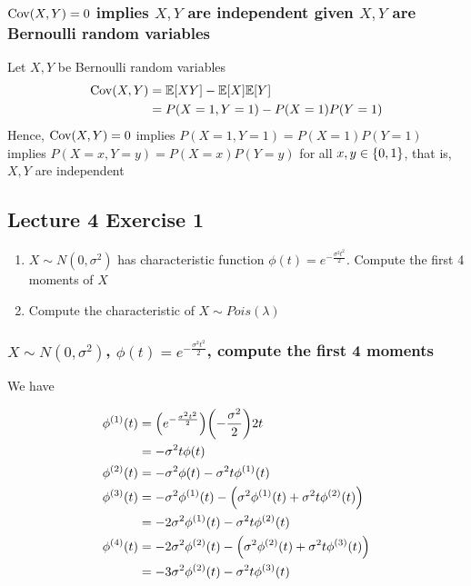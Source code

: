 \documentclass{article}
\begin{document}
\subsubsection{$\operatorname{Cov}(X, Y) = 0$ implies $X, Y$ are independent given $X, Y$ are Bernoulli random variables}

Let $X, Y$ be Bernoulli random variables
\begin{align*}
    \operatorname{Cov}(X, Y)
    &= \mathbb{E}[XY] - \mathbb{E}[X]\mathbb{E}[Y] \\
    &= P(X=1, Y=1) - P(X=1) P(Y=1)
\end{align*}
Hence, $\operatorname{Cov}(X, Y) = 0$ implies $P(X=1, Y=1) = P(X=1) P(Y=1)$ implies $P(X=x, Y=y) = P(X=x) P(Y=y)$ for all $x, y \in \{0, 1\}$, that is, $X, Y$ are independent
        

\subsection{Lecture 4 Exercise 1}

\begin{enumerate}
    \item $X \sim N(0, \sigma^2)$ has characteristic function $\phi(t) = e^{- \frac{\sigma^2 t^2}{2}}$. Compute the first 4 moments of $X$

    \item Compute the characteristic of $X \sim Pois(\lambda)$
\end{enumerate}

\subsubsection{$X \sim N(0, \sigma^2)$, $\phi(t) = e^{- \frac{\sigma^2 t^2}{2}}$, compute the first 4 moments}

We have

\begin{align*}
    \phi^{(1)}(t)
    &= \tuple*{e^{- \frac{\sigma^2 t^2}{2}}} \tuple*{-\frac{\sigma^2}{2}} 2t \\
    &= -\sigma^2 t \phi(t) \\
    \phi^{(2)}(t) 
    &= -\sigma^2 \phi(t) - \sigma^2 t \phi^{(1)}(t) \\
    \phi^{(3)}(t)
    &= -\sigma^2 \phi^{(1)}(t) - \tuple*{\sigma^2 \phi^{(1)}(t) + \sigma^2 t \phi^{(2)}(t)} \\
    &= - 2 \sigma^2 \phi^{(1)}(t) - \sigma^2 t \phi^{(2)}(t) \\
    \phi^{(4)}(t)
    &= - 2 \sigma^2 \phi^{(2)}(t) - \tuple*{\sigma^2 \phi^{(2)}(t) + \sigma^2 t \phi^{(3)}(t)} \\
    &= - 3 \sigma^2 \phi^{(2)}(t) - \sigma^2 t \phi^{(3)}(t)
\end{align*}
\end{document}
